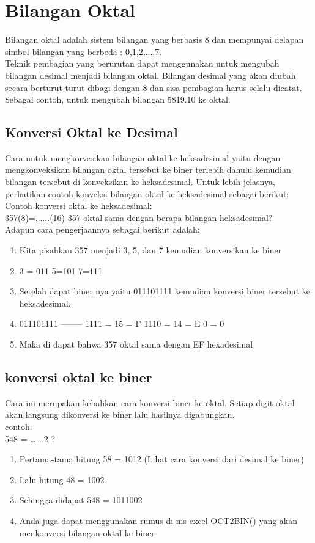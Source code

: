 \section{Bilangan Oktal} %
Bilangan oktal adalah sistem bilangan yang berbasis 8 dan mempunyai delapan simbol bilangan yang berbeda : 0,1,2,...,7.
\\
	Teknik pembagian yang berurutan dapat menggunakan untuk mengubah bilangan desimal menjadi bilangan oktal. Bilangan desimal yang akan diubah secara berturut-turut dibagi dengan 8 dan sisa pembagian harus selalu dicatat. Sebagai contoh, untuk mengubah bilangan 5819.10 ke oktal.
\subsection{Konversi Oktal ke Desimal}
Cara untuk mengkorvesikan bilangan oktal ke heksadesimal yaitu dengan mengkonveksikan bilangan oktal tersebut ke biner terlebih dahulu kemudian bilangan tersebut di konveksikan ke heksadesimal. Untuk lebih jelasnya, perhatikan contoh konveksi bilangan oktal ke heksadesimal sebagai berikut:
\\	Contoh konversi oktal ke heksadesimal:
\\357(8)=......(16) 357 oktal sama dengan berapa bilangan heksadesimal?
\\Adapun cara pengerjaannya sebagai berikut adalah:
\begin{enumerate}
	\item Kita pisahkan 357 menjadi 3, 5, dan 7 kemudian konversikan ke biner 
	\item 3 = 011		5=101		7=111
	\item Setelah dapat biner nya yaitu 011101111 kemudian konversi biner tersebut ke heksadesimal. 
	\item 011101111  -------- 1111 = 15 = F            1110 = 14 = E       0 = 0
	\item Maka di dapat bahwa 357 oktal sama dengan EF hexadesimal	
\end{enumerate}
\subsection{konversi oktal ke biner}
Cara ini merupakan kebalikan cara konversi biner ke oktal. Setiap digit oktal akan langsung dikonversi ke biner lalu hasilnya digabungkan.
\\contoh:
\\548 = …….2 ?
\\
\begin{enumerate}
	\item Pertama-tama hitung 58 = 1012 (Lihat cara konversi dari desimal ke biner)
	\item Lalu hitung 48 = 1002
	\item Sehingga didapat 548 = 1011002
	\item Anda juga dapat menggunakan rumus di ms excel OCT2BIN() yang akan menkonversi bilangan oktal ke biner
\end{enumerate}
	


